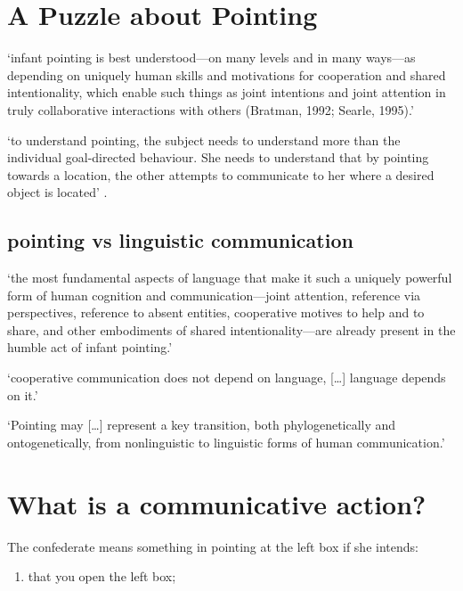 \documentclass[12pt]{extarticle}
\begin{document}
\begin{multicols}{3}
\section{A Puzzle about Pointing}

‘infant pointing is best understood---on many levels and in many ways---as depending on uniquely human skills and motivations for cooperation and shared intentionality, which enable such things as joint intentions and joint attention in truly collaborative interactions with others (Bratman, 1992; Searle, 1995).’
\citep[p.\ 706]{Tomasello:2007fi}

‘to understand pointing, the subject needs to understand more than the individual goal-directed behaviour. She needs to understand that by pointing towards a location, the other attempts to communicate to her where a desired object is located’
\citep[p.\ 6]{Moll:2007gu}.

\subsection{pointing vs linguistic communication}

‘the most fundamental aspects of language that make it such a uniquely powerful form
of human cognition and communication---joint attention, reference via perspectives,
reference to absent entities, cooperative motives to help and to share, and other
embodiments of shared intentionality---are already present in the humble act of infant
pointing.’ \citep[p.\ 719]{Tomasello:2007fi}

‘cooperative communication does not depend on language, […] language depends on it.’
\citep[p.\ 720]{Tomasello:2007fi}

‘Pointing may […] represent a key transition, both phylogenetically and
ontogenetically, from nonlinguistic to linguistic forms of human communication.’
\citep[p.\ 720]{Tomasello:2007fi}



\section{What is a communicative action?}

The confederate means something in pointing at the left box if she intends:

\begin{enumerate}

\item

that you open the left box;


\end{enumerate}
\end{multicols}
\end{document}
